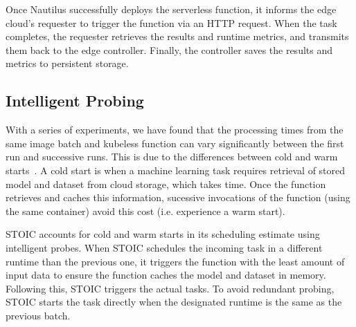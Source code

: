 Once Nautilus successfully deploys the serverless function, it informs the edge cloud's requester to trigger the function via an HTTP request. When the task completes, the requester retrieves the results and runtime metrics, and transmits them back to the edge controller. Finally, the controller saves the results and metrics to persistent storage. 
 
 \subsection{Intelligent Probing}
 With a series of experiments, we have found that the processing times from the same image batch and kubeless function can vary significantly between the first run and successive runs. This is due to the differences between cold and warm starts~\cite{ref:coldstart}.  A cold start is when a machine learning task requires retrieval of stored model and dataset from cloud storage, which takes time. Once the function retrieves and caches this information, sucessive invocations of the function (using the same container) avoid this cost (i.e. experience a warm start). 

STOIC accounts for cold and warm starts in its scheduling estimate using intelligent probes. When STOIC schedules the incoming task in a different runtime than the previous one, it triggers the function with the least amount of input data to ensure the function caches the model and dataset in memory. Following this, STOIC triggers the actual tasks. To avoid redundant probing, STOIC starts the task directly when the designated runtime is the same as the previous batch.
